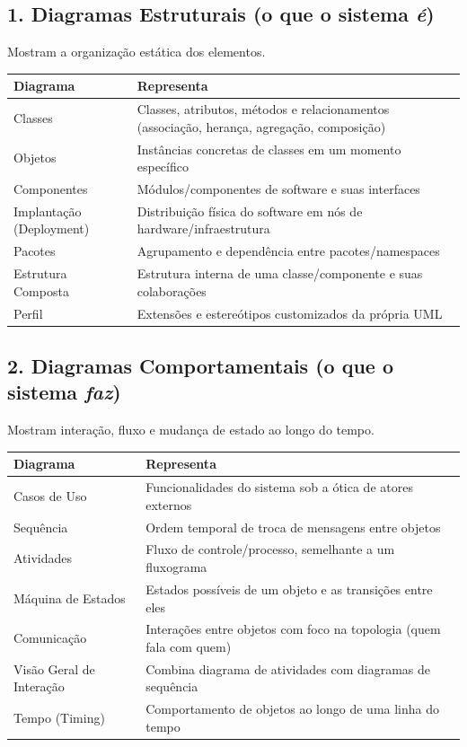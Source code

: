 \documentclass[11pt,a4paper]{article}
\begin{document}
\subsection*{1. Diagramas Estruturais (o que o sistema \emph{é})}

Mostram a organização estática dos elementos.

\begin{longtable}{p{4.2cm}p{10.3cm}}
  \hline
  \textbf{Diagrama} & \textbf{Representa} \\
  \hline
  \endhead
  \hline
  \endfoot
  Classes & Classes, atributos, métodos e relacionamentos (associação, herança, agregação, composição) \\
  Objetos & Instâncias concretas de classes em um momento específico \\
  Componentes & Módulos/componentes de software e suas interfaces \\
  Implantação (Deployment) & Distribuição física do software em nós de hardware/infraestrutura \\
  Pacotes & Agrupamento e dependência entre pacotes/namespaces \\
  Estrutura Composta & Estrutura interna de uma classe/componente e suas colaborações \\
  Perfil & Extensões e estereótipos customizados da própria UML \\
\end{longtable}

\subsection*{2. Diagramas Comportamentais (o que o sistema \emph{faz})}

Mostram interação, fluxo e mudança de estado ao longo do tempo.

\begin{longtable}{p{4.2cm}p{10.3cm}}
  \hline
  \textbf{Diagrama} & \textbf{Representa} \\
  \hline
  \endhead
  \hline
  \endfoot
  Casos de Uso & Funcionalidades do sistema sob a ótica de atores externos \\
  Sequência & Ordem temporal de troca de mensagens entre objetos \\
  Atividades & Fluxo de controle/processo, semelhante a um fluxograma \\
  Máquina de Estados & Estados possíveis de um objeto e as transições entre eles \\
  Comunicação & Interações entre objetos com foco na topologia (quem fala com quem) \\
  Visão Geral de Interação & Combina diagrama de atividades com diagramas de sequência \\
  Tempo (Timing) & Comportamento de objetos ao longo de uma linha do tempo \\
\end{longtable}
\end{document}
